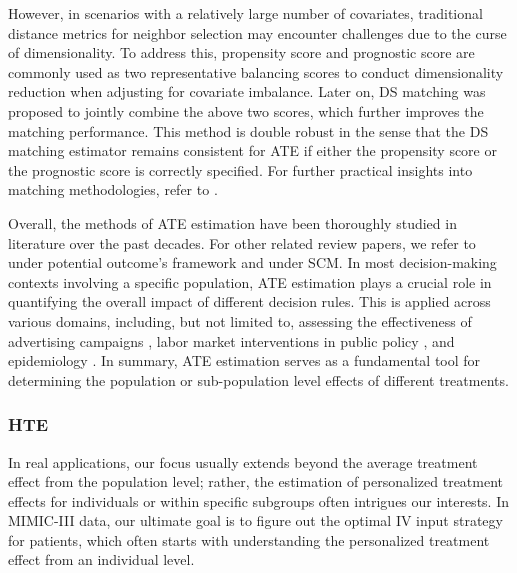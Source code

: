 However, in scenarios with a relatively large number of covariates, traditional distance metrics for neighbor selection may encounter challenges due to the curse of dimensionality. To address this, propensity score \citep{rosenbaum1983central, austin2008critical, abadie2016matching} and prognostic score \citep{hansen2008prognostic} are commonly used as two representative balancing scores to conduct dimensionality reduction when adjusting for covariate imbalance. Later on, \acrfull{DS} matching \citep{leacy2014joint, antonelli2018doubly, yang2023multiply} was proposed to jointly combine the above two scores, which further improves the matching performance. This method is double robust in the sense that the DS matching estimator remains consistent for \acrshort{ATE} if either the propensity score or the prognostic score is correctly specified. %
For further practical insights into matching methodologies, refer to \cite{zhang2022practical}.

Overall, the methods of \acrshort{ATE} estimation have been thoroughly studied in literature over the past decades. For other related review papers, we refer to \citet{yao2021survey} under potential outcome's framework and \citet{pearl2009causal} under \acrshort{SCM}. In most decision-making contexts involving a specific population, \acrshort{ATE} estimation plays a crucial role in quantifying the overall impact of different decision rules. This is applied across various domains, including, but not limited to, assessing the effectiveness of advertising campaigns \citep{farahat2012effective}, labor market interventions in public policy \citep{dehejia1999causal}, and epidemiology \citep{hernan2006estimating}. In summary, \acrshort{ATE} estimation serves as a fundamental tool for determining the population or sub-population level effects of different treatments.

\subsubsection{\acrshort{HTE}}\label{sec:CEL_HTE_p1}

In real applications, our focus usually extends beyond the average treatment effect from the population level; rather, the estimation of personalized treatment effects for individuals or within specific subgroups often intrigues our interests. In \acrshort{MIMIC-III} data, our ultimate goal is to figure out the optimal IV input strategy for patients, which often starts with understanding the personalized treatment effect from an individual level. 


